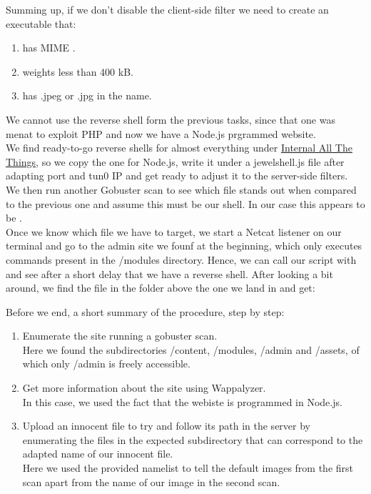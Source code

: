 {{Summing up, if we don't disable the client-side filter we need to create an executable that: 
\begin{enumerate}
\item has MIME .
\item weights less than 400 kB.
\item has .jpeg or .jpg in the name.
\end{enumerate}
We cannot use the reverse shell form the previous tasks, since that one was menat to exploit PHP and now we have a Node.js prgrammed website.\\
We find ready-to-go reverse shells for almost everything under \href{https://swisskyrepo.github.io/InternalAllTheThings/cheatsheets/shell-reverse-cheatsheet/}{Internal All The Things}, so we copy the one for Node.js, write it under a jewelshell.js file after adapting port and tun0 IP and get ready to adjust it to the server-side filters.\\
We then run another Gobuster scan to see which file stands out when compared to the previous one and assume this must be our shell. In our case this appears to be .\\
Once we know which file we have to target, we start a Netcat listener on our terminal and go to the admin site we founf at the beginning, which only executes commands present in the /modules directory. Hence, we can call our script with  and see after a short delay that we have a reverse shell. After looking a bit around, we find the file  in the folder above the one we land in and get:
}
Before we end, a short summary of the procedure, step by step: 
\begin{enumerate}
\item Enumerate the site running a gobuster scan.\\
Here we found the subdirectories /content, /modules, /admin and /assets, of which only /admin is freely accessible.
\item Get more information about the site using Wappalyzer.\\
In this case, we used the fact that the webiste is programmed in Node.js.
\item Upload an innocent file to try and follow its path in the server by enumerating the files in the expected subdirectory that can correspond to the adapted name of our innocent file.\\
Here we used the provided namelist to tell the default images from the first scan apart from the name of our image in the second scan.

\end{enumerate}}
